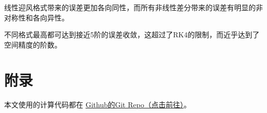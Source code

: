 \documentclass[UTF8,zihao=5]{ctexart} %
\begin{document}
线性迎风格式带来的误差更加各向同性，而所有非线性差分带来的误差有明显的非对称性和各向异性。

不同格式最高都可达到接近5阶的误差收敛，这超过了RK4的限制，而近乎达到了空间精度的阶数。


{}



\section*{附录}

本文使用的计算代码都在
\href{https://github.com/harryzhou2000/HW_ACFD}{Github的Git Repo（点击前往）}。





























\end{document}
